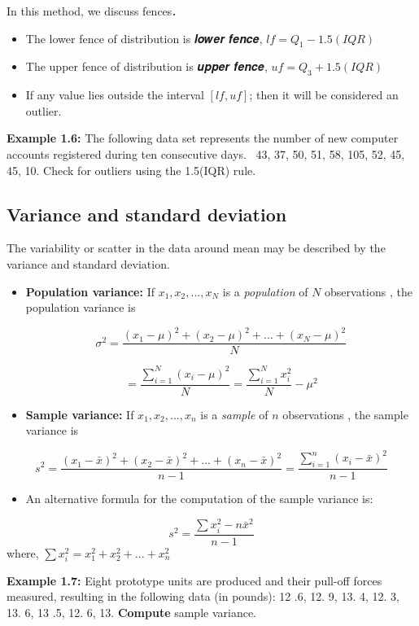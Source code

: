 \documentclass[
  11pt,
  letterpaper,
  DIV=11,
  numbers=noendperiod]{scrreprt}
\providecommand{\tightlist}{%
  \setlength{\itemsep}{0pt}\setlength{\parskip}{0pt}}
\begin{document}
In this method, we discuss fences\textbf{\emph{.}}

\begin{itemize}
\item
  The lower fence of distribution is 𝒍𝒐𝒘𝒆𝒓 𝒇𝒆𝒏𝒄𝒆, \(lf=Q_1-1.5(IQR)\)
\item
  The upper fence of distribution is 𝒖𝒑𝒑𝒆𝒓 𝒇𝒆𝒏𝒄𝒆, \(uf=Q_3+1.5(IQR)\)
\item
  If any value lies outside the interval \([lf,uf]\); then it will be
  considered an outlier.
\end{itemize}

\textbf{Example 1.6:} The following data set represents the number of
new computer accounts registered during ten consecutive days.~ 43, 37,
50, 51, 58, 105, 52, 45, 45, 10. Check for outliers using the 1.5(IQR)
rule.

\subsection{Variance and standard
deviation}\label{variance-and-standard-deviation}

The variability or scatter in the data around mean may be described by
the variance and standard deviation.

\begin{itemize}
\item
  \textbf{Population variance:} If \(x_1, x_2, ...,x_N\) is a
  \emph{population} of \(N\) observations , the population variance is

  \[\sigma^2=\frac{(x_1-\mu)^2+(x_2-\mu)^2+...+(x_N-\mu)^2}{N}\]

  \[=\frac{\sum_{i=1}^N (x_i-\mu)^2} {N}=\frac{\sum_{i=1}^N x_i^2}{N}-\mu^2\]
\item
  \textbf{Sample variance:} If \(x_1, x_2, ...,x_n\) is a \emph{sample}
  of \(n\) observations , the sample variance is
\end{itemize}

\[s^2=\frac{(x_1-\bar x)^2+(x_2-\bar x)^2+...+(x_n-\bar x)^2}{n-1}=\frac{\sum_{i=1}^n (x_i-\bar x)^2} {n-1}\]

\begin{itemize}
\tightlist
\item
  An alternative formula for the computation of the sample variance is:
\end{itemize}

\[s^2=\frac{\sum x_i^2-n\bar x^2}{n-1}\] where,
\(\sum x_i^2=x_1^2+x_2^2+...+x_n^2\)

\textbf{Example 1.7:} Eight prototype units are produced and their
pull-off forces measured, resulting in the following data (in pounds):
12 .6, 12. 9, 13. 4, 12. 3, 13. 6, 13 .5, 12. 6, 13. \textbf{Compute}
sample variance.
\end{document}
